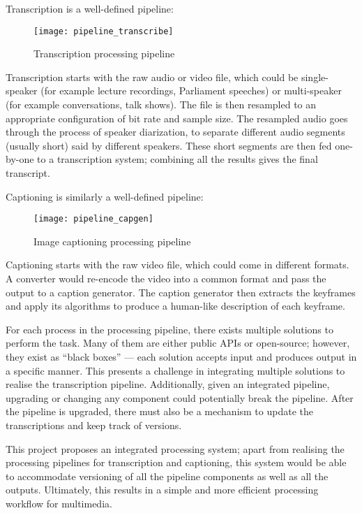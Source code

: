 Transcription is a well-defined pipeline:

\begin{figure}[h]
\begin{center}
    \texttt{[image: pipeline\_transcribe]}
    \caption{Transcription processing pipeline}\label{trans}
\end{center}
\end{figure}

Transcription starts with the raw audio or video file, which could be
single-speaker (for example lecture recordings, Parliament speeches) or
multi-speaker (for example conversations, talk shows). The file is then resampled
to an appropriate configuration of bit rate and sample size. The resampled audio
goes through the process of speaker diarization, to separate different audio
segments (usually short) said by different speakers. These short segments are
then fed one-by-one to a transcription system; combining all the results gives
the final transcript.

Captioning is similarly a well-defined pipeline:

\begin{figure}[h]
\begin{center}
    \texttt{[image: pipeline\_capgen]}
    \caption{Image captioning processing pipeline}\label{cap}
\end{center}
\end{figure}

Captioning starts with the raw video file, which could come in different formats.
A converter would re-encode the video into a common format and pass the output
to a caption generator. The caption generator then extracts the keyframes and
apply its algorithms to produce a human-like description of each keyframe.

For each process in the processing pipeline, there exists multiple solutions
to perform the task. Many of them are either public APIs
or open-source; however, they exist as ``black boxes'' --- each solution accepts
input and produces output in a specific manner. This presents a challenge in
integrating multiple solutions to realise the transcription pipeline.
Additionally, given an integrated pipeline, upgrading or changing any component
could potentially break the pipeline. After the pipeline is upgraded, there must
also be a mechanism to update the transcriptions and keep track of versions. 

This project proposes an integrated processing system; apart from realising
the processing pipelines for transcription and captioning, this system would be
able to accommodate versioning
of all the pipeline components as well as all the outputs. Ultimately, this
results in a simple and more efficient processing workflow for multimedia.

